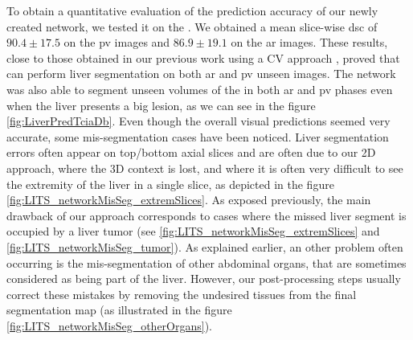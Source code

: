 To obtain a quantitative evaluation of the prediction accuracy of our newly created
 network, we tested it on the \textbf{}. We
obtained a mean slice-wise \ac{dsc} of $ 90.4 \pm 17.5 $ on the \ac{pv} images and
$ 86.9 \pm 19.1 $ on the \ac{ar} images. These results, close to those obtained
in our previous work using a CV approach \cite{Ouhmich2019}, proved that  can perform liver segmentation on both \ac{ar} and \ac{pv} unseen images.
The  network was also able to segment unseen volumes of the
\textbf{} in both \ac{ar} and \ac{pv} phases even when the liver presents a big lesion, as we can see in the figure \ref{fig:LiverPredTciaDb}.
Even though the overall visual predictions seemed very accurate, some mis-segmentation cases have been noticed. Liver segmentation errors often appear on top/bottom axial slices and are often due to our 2D approach, where the 3D context is lost, and where it is often very difficult to see the extremity of the liver in a single slice, as depicted in the figure \ref{fig:LITS_networkMisSeg_extremSlices}. As exposed previously, the main drawback of our approach corresponds to cases where the missed liver segment is occupied by a liver tumor (see \ref{fig:LITS_networkMisSeg_extremSlices} and \ref{fig:LITS_networkMisSeg_tumor}).
As explained earlier, an other problem often occurring is the mis-segmentation of other abdominal organs, that are sometimes considered as being part of the liver. However, our post-processing steps usually correct these mistakes by removing the undesired tissues from the final segmentation map (as illustrated in the figure \ref{fig:LITS_networkMisSeg_otherOrgans}).


